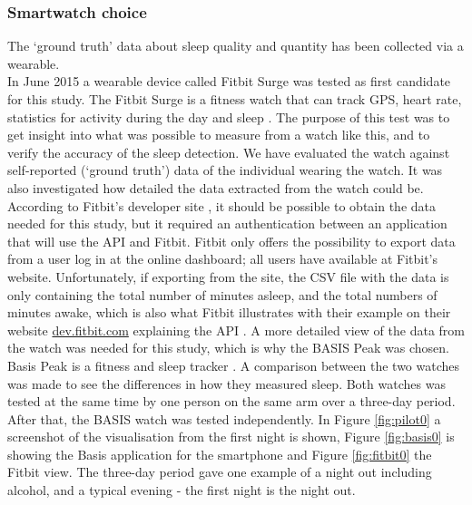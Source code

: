 \documentclass[12pt]{article} %
\begin{document}
\subsubsection{Smartwatch choice}
The `ground truth' data about sleep quality and quantity has been collected via a wearable. \\

In June 2015 a wearable device called Fitbit Surge was tested as first candidate for this study. The Fitbit Surge is a fitness watch that can track GPS, heart rate, statistics for activity during the day and sleep \cite{fitbit}. The purpose of this test was to get insight into what was possible to measure from a watch like this, and to verify the accuracy of the sleep detection. We have evaluated the watch against self-reported (`ground truth') data of the individual wearing the watch. It was also investigated how detailed the data extracted from the watch could be.  \\

According to Fitbit's developer site \cite{fitbit_dev}, it should be possible to obtain the data needed for this study, but it required an authentication between an application that will use the API and Fitbit. Fitbit only offers the possibility to export data from a user log in at the online dashboard; all users have available at Fitbit's website. Unfortunately, if exporting from the site, the CSV file with the data is only containing the total number of minutes asleep, and the total numbers of minutes awake, which is also what Fitbit illustrates with their example on their website \url{dev.fitbit.com} explaining the API \cite{fitbit_dev}. A more detailed view of the data from the watch was needed for this study, which is why the BASIS Peak was chosen.\\

Basis Peak is a fitness and sleep tracker \cite{basis}. A comparison between the two watches was made to see the differences in how they measured sleep. Both watches was tested at the same time by one person on the same arm over a three-day period. After that, the BASIS watch was tested independently. In Figure \ref{fig:pilot0} a screenshot of the visualisation from the first night is shown, Figure \ref{fig:basis0} is showing the Basis application for the smartphone and Figure \ref{fig:fitbit0} the Fitbit view. The three-day period gave one example of a night out including alcohol, and a typical evening - the first night is the night out. 
\end{document}
